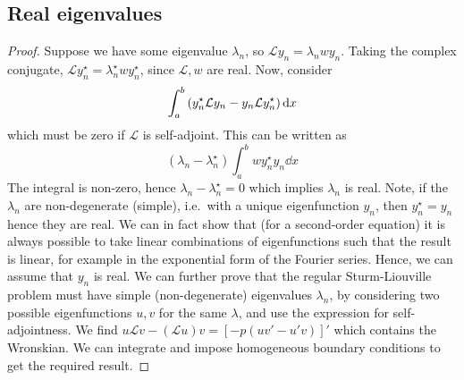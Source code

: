 \subsection{Real eigenvalues}
\begin{proof}
	Suppose we have some eigenvalue \( \lambda_n \), so \( \mathcal L y_n = \lambda_n w y_n \).
	Taking the complex conjugate, \( \mathcal L y_n^\star = \lambda_n^\star w y_n^\star \), since \( \mathcal L, w \) are real.
	Now, consider
	\[
		\int_a^b \qty(y_n^\star \mathcal L y_n - y_n \mathcal L y_n^\star) \dd{x}
	\]
	which must be zero if \( \mathcal L \) is self-adjoint.
	This can be written as
	\[
		(\lambda_n - \lambda_n^\star) \int_a^b w y_n^\star y_n \dd{x}
	\]
	The integral is non-zero, hence \( \lambda_n - \lambda_n^\star = 0 \) which implies \( \lambda_n \) is real.
	Note, if the \( \lambda_n \) are non-degenerate (simple), i.e.\ with a unique eigenfunction \( y_n \), then \( y_n^\star = y_n \) hence they are real.
	We can in fact show that (for a second-order equation) it is always possible to take linear combinations of eigenfunctions such that the result is linear, for example in the exponential form of the Fourier series.
	Hence, we can assume that \( y_n \) is real.
	We can further prove that the regular Sturm-Liouville problem must have simple (non-degenerate) eigenvalues \( \lambda_n \), by considering two possible eigenfunctions \( u, v \) for the same \( \lambda \), and use the expression for self-adjointness.
	We find \( u \mathcal L v - (\mathcal L u) v = [-p(uv' - u'v)]' \) which contains the Wronskian.
	We can integrate and impose homogeneous boundary conditions to get the required result.
\end{proof}
